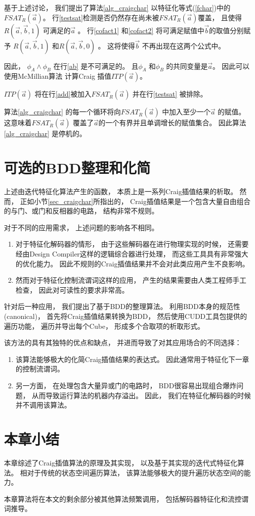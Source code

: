 基于上述讨论，
我们提出了算法\ref{alg_craigchar} 以特征化等式(\ref{fchar})中的$FSAT_R(\vec{a})$。
行\ref{testsat}检测是否仍然存在尚未被$FSAT_R(\vec{a})$覆盖，
且使得$R(\vec{a},\vec{b},1)$ 可满足的$\vec{a}$ 。
行\ref{cofact1} 和\ref{cofact2} 将可满足赋值中$\vec{b}$的取值分别赋予
$R(\vec{a},\vec{b},1)$ 和$R(\vec{a},\vec{b},0)$ 。
这将使得$\vec{b}$ 不再出现在这两个公式中。

因此，
$\phi_A\wedge \phi_B$ 在行\ref{ab} 是不可满足的。
且$\phi_A$ 和$\phi_B$ 的共同变量是$\vec{a}$。
因此可以使用McMillian算法 计算Craig 插值$ITP(\vec{a})$。

$ITP(\vec{a})$ 将在行\ref{add}被加入$FSAT_R(\vec{a})$  并在行\ref{testsat} 被排除。

算法\ref{alg_craigchar} 的每一个循环将向$FSAT_R(\vec{a})$ 中加入至少一个$\vec{a}$ 的赋值。
这意味着$FSAT_R(\vec{a})$ 覆盖了$\vec{a}$的一个有界并且单调增长的赋值集合。
因此算法\ref{alg_craigchar} 是停机的。

\section{可选的BDD整理和化简}\label{sec_bdd_simp}

上述由迭代特征化算法产生的函数，
本质上是一系列Craig插值结果的析取。
然而，
正如小节\ref{sec_craigchar}所指出的，
Craig插值结果是一个包含大量自由组合的与门、或门和反相器的电路，
结构非常不规则。

对于不同的应用需求，
上述问题的影响各不相同。
\begin{enumerate}
\item 对于特征化解码器的情形，
由于这些解码器在进行物理实现的时候，
还需要经由Design Compiler这样的逻辑综合器进行处理，
而这些工具具有非常强大的优化能力。
因此不规则的Craig插值结果并不会对此类应用产生不良影响。
\item 然而对于特征化控制流谓词这样的应用，
产生的结果需要由人类工程师手工检查，
因此对可读性的要求非常高。
\end{enumerate}

针对后一种应用，
我们提出了基于BDD的整理算法。
利用BDD本身的规范性(canonical)，
首先将Craig插值结果转换为BDD，
然后使用CUDD工具包提供的遍历功能，
遍历并导出每个Cube，
形成多个合取项的析取形式。

该方法的具有其独特的优点和缺点，
并进而导致了对其应用场合的不同选择：

\begin{enumerate}
\item 该算法能够极大的化简Craig插值结果的表达式。
因此通常用于特征化下一章的控制流谓词。

\item 另一方面，
在处理包含大量异或门的电路时，
BDD很容易出现组合爆炸问题，
从而导致运行算法的机器内存溢出。
因此，
我们在特征化解码器的时候并不调用该算法。
\end{enumerate}

\section{本章小结}
本章综述了Craig插值算法的原理及其实现，
以及基于其实现的迭代式特征化算法。
相对于传统的状态空间遍历算法，
该算法能够极大的提升遍历状态空间的能力。

本章算法将在本文的剩余部分被其他算法频繁调用，
包括解码器特征化和流控谓词推导。
